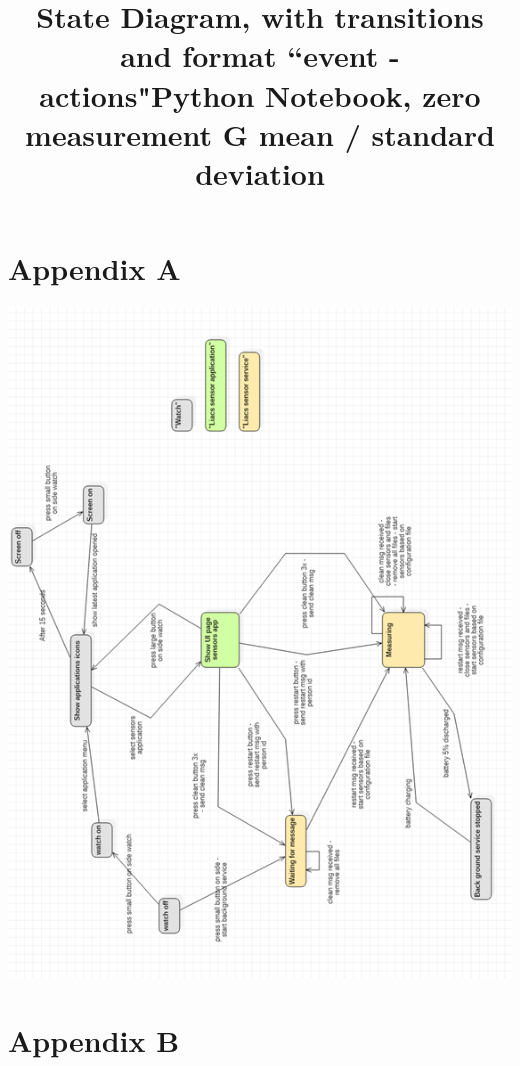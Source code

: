 \documentclass[12pt, a4paper]{article}
\begin{document}
\section{Appendix A}
\title{State Diagram, with transitions and format ``event - actions"}

    \includegraphics[width=.999\textwidth]{Pic 37.png}
    
\section{Appendix B}
\title{Python Notebook, zero measurement G mean / standard deviation}
\end{document}
